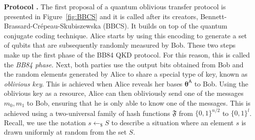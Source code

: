 \noindent\textbf{Protocol \cite{BBCS92}.} The first proposal of a quantum oblivious transfer protocol is presented in Figure~\ref{fig:BBCS} and it is called after its creators, Bennett-Brassard-Cr{\'e}peau-Skubiszewska (BBCS). It builds on top of the quantum conjugate coding technique. Alice starts by using this encoding to generate a set of qubits that are subsequently randomly measured by Bob. These two steps make up the first phase of the BB84 QKD protocol. For this reason, this is called the \textit{BB84 phase}. Next, both parties use the output bits obtained from Bob and the random elements generated by Alice to share a special type of key, known as \textit{oblivious key}. This is achieved when Alice reveals her bases $\bm{\theta}^{\mathsf{A}}$ to Bob. Using the oblivious key as a resource, Alice can then obliviously send one of the messages $m_0, m_1$ to Bob, ensuring that he is only able to know one of the messages. This is achieved using a two-universal family of hash functions $\mathfrak{F}$ from $\{0,1\}^{n/2}$ to $\{0,1\}^{l}$. Recall, we use the notation $s\leftarrow_{\$}S$ to describe a situation where an element $s$ is drawn uniformly at random from the set $S$.

